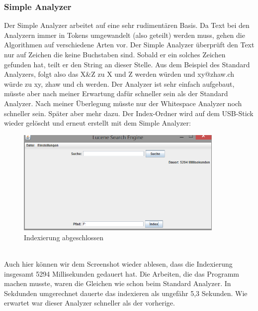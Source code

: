 \documentclass[12pt,a4paper,ngerman]{report}
\begin{document}
\subsubsection{Simple Analyzer}
Der Simple Analyzer arbeitet auf eine sehr rudimentären Basis. Da Text bei den Analyzern immer in Tokens umgewandelt (also geteilt) werden muss, gehen die Algorithmen auf verschiedene Arten vor. Der Simple Analyzer überprüft den Text nur auf Zeichen die keine Buchstaben sind. Sobald er ein solches Zeichen gefunden hat, teilt er den String an dieser Stelle. Aus dem Beispiel des Standard Analyzers, folgt also das X\&Z zu X und Z werden würden und xy@zhaw.ch würde zu xy, zhaw und ch werden. Der Analyzer ist sehr einfach aufgebaut, müsste aber nach meiner Erwartung dafür schneller sein als der Standard Analyzer. Nach meiner Überlegung müsste nur der Whitespace Analyzer noch schneller sein. Später aber mehr dazu.
\newpage
Der Index-Ordner wird auf dem USB-Stick wieder gelöscht und erneut erstellt mit dem Simple Analyzer:
\begin{figure}[h!]
\centering
\includegraphics[width=10cm]{img/simple-analyzer-index.png}
\caption{Indexierung abgeschlossen\protect\footnotemark}
\end{figure}
\\
Auch hier können wir dem Screenshot wieder ablesen, dass die Indexierung insgesamt 5294 Millisekunden gedauert hat. Die Arbeiten, die das Programm machen musste, waren die Gleichen wie schon beim Standard Analyzer. In Sekdunden umgerechnet dauerte das indexieren als ungefähr 5,3 Sekunden. Wie erwartet war dieser Analyzer schneller als der vorherige.
\end{document}
